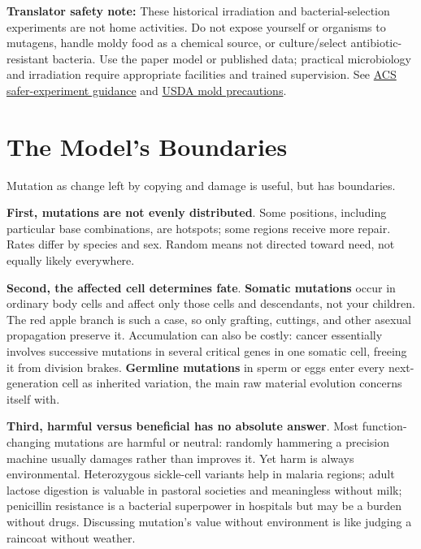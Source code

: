 \textbf{Translator safety note:} These historical irradiation and bacterial-selection experiments are not home activities. Do not expose yourself or organisms to mutagens, handle moldy food as a chemical source, or culture/select antibiotic-resistant bacteria. Use the paper model or published data; practical microbiology and irradiation require appropriate facilities and trained supervision. See \href{https://institute.acs.org/acs-center/lab-safety/education-training/safer-experiments.html}{ACS safer-experiment guidance} and \href{https://www.fsis.usda.gov/food-safety/safe-food-handling-and-preparation/food-safety-basics/molds-food-are-they-dangerous}{USDA mold precautions}.

\section{The Model's Boundaries}

Mutation as change left by copying and damage is useful, but has boundaries.

\textbf{First, mutations are not evenly distributed}. Some positions, including particular base combinations, are hotspots; some regions receive more repair. Rates differ by species and sex. Random means not directed toward need, not equally likely everywhere.

\textbf{Second, the affected cell determines fate}. \textbf{Somatic mutations} occur in ordinary body cells and affect only those cells and descendants, not your children. The red apple branch is such a case, so only grafting, cuttings, and other asexual propagation preserve it. Accumulation can also be costly: cancer essentially involves successive mutations in several critical genes in one somatic cell, freeing it from division brakes. \textbf{Germline mutations} in sperm or eggs enter every next-generation cell as inherited variation, the main raw material evolution concerns itself with.

\textbf{Third, harmful versus beneficial has no absolute answer}. Most function-changing mutations are harmful or neutral: randomly hammering a precision machine usually damages rather than improves it. Yet harm is always environmental. Heterozygous sickle-cell variants help in malaria regions; adult lactose digestion is valuable in pastoral societies and meaningless without milk; penicillin resistance is a bacterial superpower in hospitals but may be a burden without drugs. Discussing mutation's value without environment is like judging a raincoat without weather.


